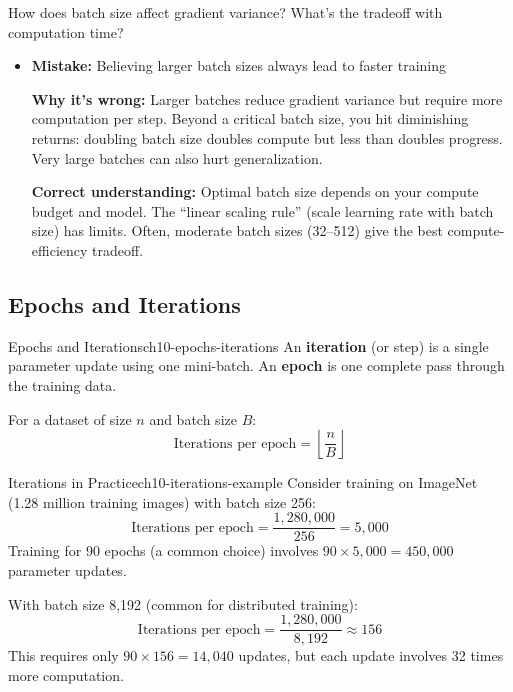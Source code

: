 \documentclass[../../main.tex]{subfiles}
\begin{document}
\begin{checkpoint}
How does batch size affect gradient variance? What's the tradeoff with computation time?
\end{checkpoint}

\begin{commonmistakes}
\begin{itemize}
    \item \textbf{Mistake:} Believing larger batch sizes always lead to faster training

    \textbf{Why it's wrong:} Larger batches reduce gradient variance but require more computation per step. Beyond a critical batch size, you hit diminishing returns: doubling batch size doubles compute but less than doubles progress. Very large batches can also hurt generalization.

    \textbf{Correct understanding:} Optimal batch size depends on your compute budget and model. The ``linear scaling rule'' (scale learning rate with batch size) has limits. Often, moderate batch sizes (32--512) give the best compute-efficiency tradeoff.
\end{itemize}
\end{commonmistakes}

\subsection{Epochs and Iterations}

\begin{definition}{Epochs and Iterations}{ch10-epochs-iterations}
An \textbf{iteration} (or step) is a single parameter update using one mini-batch. An \textbf{epoch} is one complete pass through the training data.

For a dataset of size $n$ and batch size $B$:
\[
    \text{Iterations per epoch} = \left\lfloor \frac{n}{B} \right\rfloor
\]
\end{definition}

\begin{example}{Iterations in Practice}{ch10-iterations-example}
Consider training on ImageNet (1.28 million training images) with batch size 256:
\[
    \text{Iterations per epoch} = \frac{1,280,000}{256} = 5,000
\]
Training for 90 epochs (a common choice) involves $90 \times 5,000 = 450,000$ parameter updates.

With batch size 8,192 (common for distributed training):
\[
    \text{Iterations per epoch} = \frac{1,280,000}{8,192} \approx 156
\]
This requires only $90 \times 156 = 14,040$ updates, but each update involves 32 times more computation.
\end{example}
\end{document}
